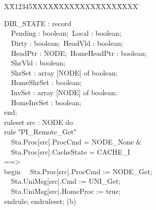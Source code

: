 \documentclass{llncs}
\newlength{\fminilength}
\newenvironment{fmini}[1][\linewidth]
  {\setlength{\fminilength}{#1\fboxsep-2\fboxrule}%
   \vspace{2ex}\noindent\begin{lrbox}{\fminibox}\begin{minipage}{\fminilength}%
   \mbox{ }\hfill\vspace{-2.5ex}}%
  {\end{minipage}\end{lrbox}\vspace{1ex}\hspace{0ex}%
   \framebox{\usebox{\fminibox}}}
\newenvironment{specification}
{\noindent\scriptsize
\tt\begin{fmini}\begin{tabbing}X\=X12345\=XXXX\=XXXX\=XXXX\=XXXX\=XXXX
\=\+\kill} {\end{tabbing}\normalfont\end{fmini}}
\def \twoSpaces {\ \ }
\def \twoSpaces {\ \ }
\begin{document}
\begin{specification}
\begin{minipage}[t]{0.4\linewidth}
  DIR\_STATE : record\\
\twoSpaces     Pending : boolean;\     Local : boolean;\\
\twoSpaces     Dirty : boolean;\      HeadVld : boolean;\\
\twoSpaces     HeadPtr : NODE;\      HomeHeadPtr : boolean;\\
\twoSpaces     ShrVld : boolean;\\
\twoSpaces     ShrSet : array [NODE] of boolean;\\
\twoSpaces     HomeShrSet : boolean;\\
\twoSpaces     InvSet : array [NODE] of boolean;\\
\twoSpaces     HomeInvSet : boolean;\\
  end;\\

  ruleset src : NODE do\\
rule "PI\_Remote\_Get"\\
\twoSpaces   Sta.Proc[src].ProcCmd = NODE\_None \&\\
\twoSpaces   Sta.Proc[src].CacheState = CACHE\_I\\
==>\\
begin
\twoSpaces   Sta.Proc[src].ProcCmd := NODE\_Get;\\
\twoSpaces   Sta.UniMsg[src].Cmd := UNI\_Get;\\
\twoSpaces   Sta.UniMsg[src].HomeProc := true;\\
endrule; endruleset;
\center (b)\\
\twoSpaces \\
\end{minipage}
\end{specification}
\end{document}
